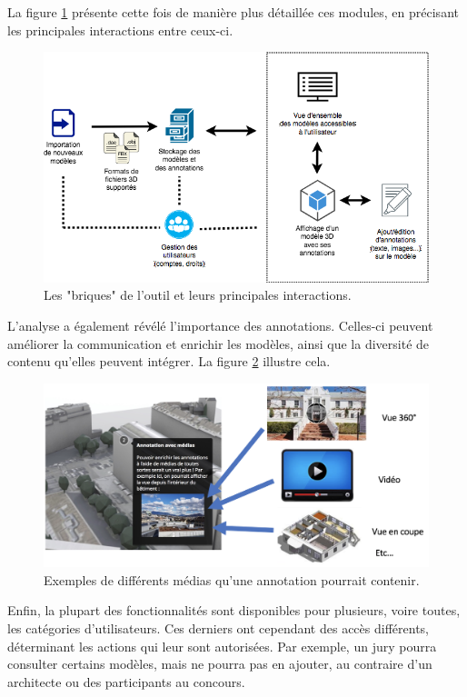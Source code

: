 La figure \ref{fig:mip-viewer-components-interactions-diagram} présente cette fois de manière plus détaillée ces modules, en précisant les principales interactions entre ceux-ci.

\begin{figure}
    \centering
    \includegraphics[width=0.9\linewidth]{Figures/mip-viewer-components-interactions-diagram.png}
    \caption{Les "briques" de l'outil et leurs principales interactions.}
    \label{fig:mip-viewer-components-interactions-diagram}
\end{figure}

L'analyse a également révélé l'importance des annotations. Celles-ci peuvent améliorer la communication et enrichir les modèles, ainsi que la diversité de contenu qu'elles peuvent intégrer. La figure \ref{fig:various-media-for-annotation} illustre cela.

\begin{figure}
    \centering
    \includegraphics[width=\linewidth]{Figures/various-media-for-annotation.png}
    \caption{Exemples de différents médias qu'une annotation pourrait contenir.}
    \label{fig:various-media-for-annotation}
\end{figure}

Enfin, la plupart des fonctionnalités sont disponibles pour plusieurs, voire toutes, les catégories d'utilisateurs. Ces derniers ont cependant des accès différents, déterminant les actions qui leur sont autorisées. Par exemple, un jury pourra consulter certains modèles, mais ne pourra pas en ajouter, au contraire d'un architecte ou des participants au concours.

